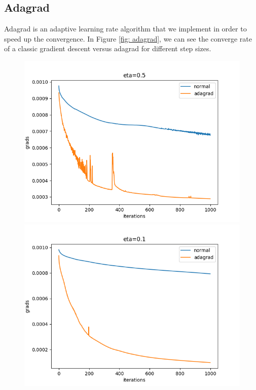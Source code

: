 \documentclass[11pt]{article}
\begin{document}
\subsection{Adagrad}
Adagrad \cite{AdaGrad} is an adaptive learning rate algorithm that we implement in order to speed up the convergence. In Figure \ref{fig: adagrad}, we can see the converge rate of a classic gradient descent versus adagrad for different step sizes.
\begin{figure}[H]
\centering
\includegraphics[scale=0.5]{images/adagrad/adagrad_plot_0.png}	
\includegraphics[scale=0.5]{images/adagrad/adagrad_plot_1.png}	

\end{figure}
\end{document}
